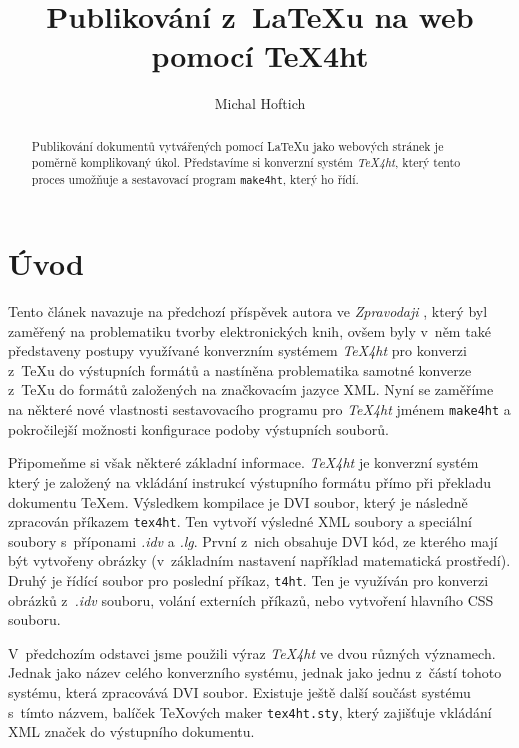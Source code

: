 \documentclass{csbulletin}
\newcommand\nazev[1]{\textit{#1}}
\newcommand\prikaz[1]{\texttt{#1}}
\begin{document}
\title{Publikování z~\LaTeX u na web pomocí TeX4ht}
\author{Michal Hoftich}
\maketitle

\begin{abstract}
Publikování dokumentů vytvářených pomocí \LaTeX u jako webových stránek je
poměrně komplikovaný úkol. Představíme si konverzní systém \nazev{TeX4ht}, který
tento proces umožňuje a sestavovací program \prikaz{make4ht}, který ho řídí.
\end{abstract}

\section{Úvod}



Tento článek navazuje na předchozí příspěvek autora ve \nazev{Zpravodaji}
\parencite{hoftich:16}, který byl zaměřený na problematiku tvorby
elektronických knih, ovšem byly v~něm také
představeny postupy využívané konverzním systémem \nazev{TeX4ht} pro konverzi
z~\TeX u do výstupních formátů a nastíněna problematika samotné konverze z~\TeX u
do formátů založených na značkovacím jazyce XML. 
Nyní se zaměříme na některé nové vlastnosti sestavovacího programu pro \nazev{TeX4ht} jménem
\prikaz{make4ht} a pokročilejší možnosti konfigurace podoby výstupních souborů.

Připomeňme si však některé základní informace. \nazev{TeX4ht} je konverzní
systém který je založený na vkládání instrukcí výstupního formátu přímo při
překladu dokumentu \TeX em. Výsledkem kompilace je DVI soubor, který je
následně zpracován příkazem \prikaz{tex4ht}. Ten vytvoří výsledné XML soubory a
speciální soubory s~příponami \nazev{.idv} a \nazev{.lg}.
První z~nich obsahuje DVI kód, ze kterého mají být vytvořeny obrázky
(v~základním nastavení například matematická prostředí). Druhý je řídící soubor
pro poslední příkaz, \prikaz{t4ht}. Ten je využíván pro konverzi obrázků
z~\nazev{.idv} souboru, volání externích příkazů, nebo vytvoření hlavního CSS
souboru.

V~předchozím odstavci jsme použili výraz \nazev{TeX4ht} ve dvou různých
významech. Jednak jako název celého konverzního systému, jednak jako jednu
z~částí tohoto systému, která zpracovává DVI soubor. Existuje ještě další součást
systému s~tímto názvem, balíček \TeX ových maker \prikaz{tex4ht.sty}, který
zajišťuje vkládání XML značek do výstupního dokumentu.
\end{document}
